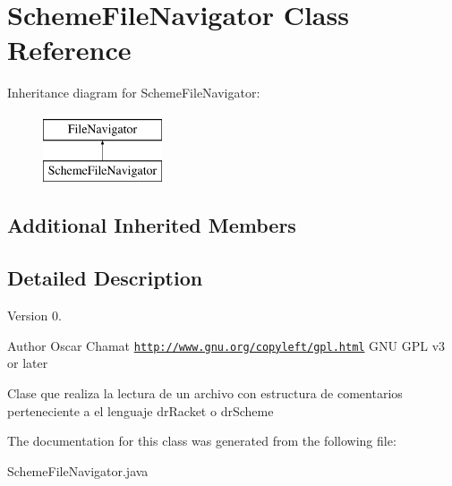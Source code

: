 \hypertarget{classSchemeFileNavigator}{\section{Scheme\-File\-Navigator Class Reference}
\label{classSchemeFileNavigator}
}
Inheritance diagram for Scheme\-File\-Navigator\-:\begin{figure}[H]
\begin{center}
\leavevmode
\includegraphics[height=2.000000cm]{classSchemeFileNavigator}
\end{center}
\end{figure}
\subsection*{Additional Inherited Members}


\subsection{Detailed Description}
\begin{DoxyVersion}{Version}
0. 
\end{DoxyVersion}
\begin{DoxyAuthor}{Author}
Oscar Chamat  \href{http://www.gnu.org/copyleft/gpl.html}{\tt http\-://www.\-gnu.\-org/copyleft/gpl.\-html} G\-N\-U G\-P\-L v3 or later
\end{DoxyAuthor}
Clase que realiza la lectura de un archivo con estructura de comentarios perteneciente a el lenguaje dr\-Racket o dr\-Scheme 

The documentation for this class was generated from the following file\-:\begin{DoxyCompactItemize}
\item 
Scheme\-File\-Navigator.\-java\end{DoxyCompactItemize}
